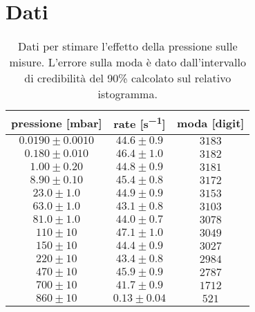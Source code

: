 \section{Dati}

\begin{table}[h]
\centering
\begin{tabular}{c|c|c}

pressione [mbar] & rate [\si{s^{-1}}] & moda [digit] \\
\hline
$ 0.0190 \pm 0.0010 $ & $ 44.6 \pm 0.9 $ & $ 3183 $ \\ 
$ 0.180 \pm 0.010 $ & $ 46.4 \pm 1.0 $ & $ 3182 $ \\ 
$ 1.00 \pm 0.20 $ & $ 44.8 \pm 0.9 $ & $ 3181 $ \\ 
$ 8.90 \pm 0.10 $ & $ 45.4 \pm 0.8 $ & $ 3172 $ \\ 
$ 23.0 \pm 1.0 $ & $ 44.9 \pm 0.9 $ & $ 3153 $ \\ 
$ 63.0 \pm 1.0 $ & $ 43.1 \pm 0.8 $ & $ 3103 $ \\ 
$ 81.0 \pm 1.0 $ & $ 44.0 \pm 0.7 $ & $ 3078 $ \\ 
$ 110 \pm 10 $ & $ 47.1 \pm 1.0 $ & $ 3049 $ \\ 
$ 150 \pm 10 $ & $ 44.4 \pm 0.9 $ & $ 3027 $ \\ 
$ 220 \pm 10 $ & $ 43.4 \pm 0.8 $ & $ 2984 $ \\ 
$ 470 \pm 10 $ & $ 45.9 \pm 0.9 $ & $ 2787 $ \\ 
$ 700 \pm 10 $ & $ 41.7 \pm 0.9 $ & $ 1712 $ \\ 
$ 860 \pm 10 $ & $ 0.13 \pm 0.04 $ & $ 521 $ \\ 

\end{tabular}
\caption{Dati per stimare l'effetto della pressione sulle misure. L'errore sulla moda è dato dall'intervallo di credibilità del 90\% calcolato sul relativo istogramma.}
\label{tab:press}
\end{table}


